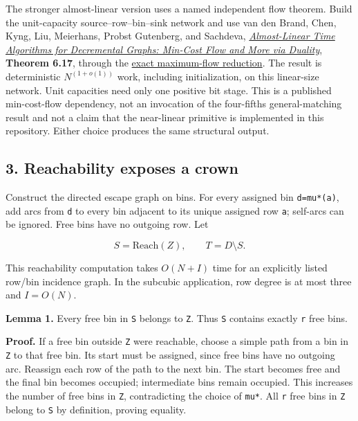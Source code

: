 The stronger almost-linear version uses a named independent flow theorem. Build the unit-capacity source--row--bin--sink network and use van den Brand, Chen, Kyng, Liu, Meierhans, Probst Gutenberg, and Sachdeva, \href{https://arxiv.org/abs/2407.10830v1}{\emph{Almost-Linear Time Algorithms for Decremental Graphs: Min-Cost Flow and More via Duality}}, \textbf{Theorem 6.17}, through the \href{https://github.com/icekylinx/algorithm-frontier/blob/main/manuscripts/graph-backends/published-flow-capacity-scaling.md}{exact maximum-flow reduction}. The result is deterministic \(N^(1+o(1))\) work, including initialization, on this linear-size network. Unit capacities need only one positive bit stage. This is a published min-cost-flow dependency, not an invocation of the four-fifths general-matching result and not a claim that the near-linear primitive is implemented in this repository. Either choice produces the same structural output.

\hypertarget{af-f687f276ee-reachability-exposes-a-crown}{%
\subsection{3. Reachability exposes a crown}\label{af-f687f276ee-reachability-exposes-a-crown}}

Construct the directed escape graph on bins. For every assigned bin \texttt{d=mu*(a)}, add arcs from \texttt{d} to every bin adjacent to its unique assigned row \texttt{a}; self-arcs can be ignored. Free bins have no outgoing row. Let

\[
S=\mathrm{Reach}(Z),\qquad T=D\setminus S.
\]

This reachability computation takes \(O(N+I)\) time for an explicitly listed row/bin incidence graph. In the subcubic application, row degree is at most three and \(I=O(N)\).

\textbf{Lemma 1.} Every free bin in \texttt{S} belongs to \texttt{Z}. Thus \texttt{S} contains exactly \texttt{r} free bins.

\textbf{Proof.} If a free bin outside \texttt{Z} were reachable, choose a simple path from a bin in \texttt{Z} to that free bin. Its start must be assigned, since free bins have no outgoing arc. Reassign each row of the path to the next bin. The start becomes free and the final bin becomes occupied; intermediate bins remain occupied. This increases the number of free bins in \texttt{Z}, contradicting the choice of \texttt{mu*}. All \texttt{r} free bins in \texttt{Z} belong to \texttt{S} by definition, proving equality.

